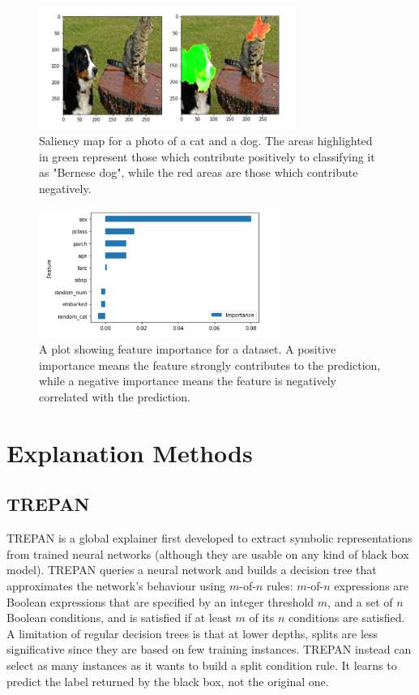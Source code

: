 \begin{figure}[ht]
    \centering
    \includegraphics[width=0.75\textwidth]{img/saliency_map_dog_cat.png}
    \caption{Saliency map for a photo of a cat and a dog. The areas highlighted in green represent those which contribute positively to classifying it as "Bernese dog", while the red areas are those which contribute negatively.}
\end{figure}
\begin{figure}[ht]
    \centering
    \includegraphics[width=0.70\textwidth]{img/feature_importance.png}
    \caption{A plot showing feature importance for a dataset. A positive importance means the feature strongly contributes to the prediction, while a negative importance means the feature is negatively correlated with the prediction.}
\end{figure}

\section{Explanation Methods}

\subsection{TREPAN}

TREPAN is a global explainer first developed to extract symbolic representations from trained neural networks (although they are usable on any kind of black box model). TREPAN queries a neural network and builds a decision tree that approximates the network's behaviour using $m$-of-$n$ rules: $m$-of-$n$ expressions are Boolean expressions that are specified by an integer threshold $m$, and a set of $n$ Boolean conditions, and is satisfied if at least $m$ of its $n$ conditions are satisfied. A limitation of regular decision trees is that at lower depths, splits are less significative since they are based on few training instances. TREPAN instead can select as many instances as it wants to build a split condition rule. It learns to predict the label returned by the black box, not the original one.

